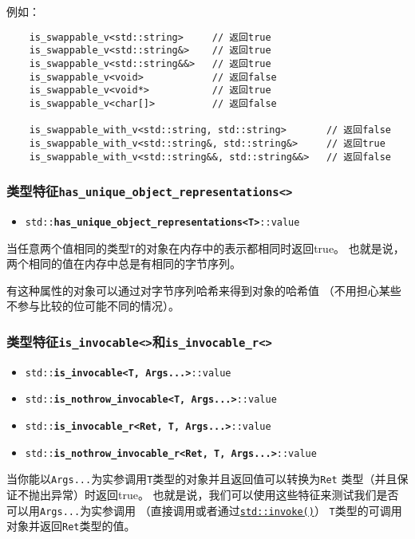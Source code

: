 例如：
\begin{lstlisting}
    is_swappable_v<std::string>     // 返回true
    is_swappable_v<std::string&>    // 返回true
    is_swappable_v<std::string&&>   // 返回true
    is_swappable_v<void>            // 返回false
    is_swappable_v<void*>           // 返回true
    is_swappable_v<char[]>          // 返回false

    is_swappable_with_v<std::string, std::string>       // 返回false
    is_swappable_with_v<std::string&, std::string&>     // 返回true
    is_swappable_with_v<std::string&&, std::string&&>   // 返回false
\end{lstlisting}

\subsubsection{类型特征\texttt{has\_unique\_object\_representations<>}}
\begin{itemize}
    \item[] \texttt{std::\textbf{has\_unique\_object\_representations<T>}::value}
\end{itemize}
当任意两个值相同的类型\texttt{T}的对象在内存中的表示都相同时返回true。
也就是说，两个相同的值在内存中总是有相同的字节序列。

有这种属性的对象可以通过对字节序列哈希来得到对象的哈希值
（不用担心某些不参与比较的位可能不同的情况）。

\subsubsection{类型特征\texttt{is\_invocable<>}和\texttt{is\_invocable\_r<>}}
\begin{itemize}
    \item[] \texttt{std::\textbf{is\_invocable<T, Args...>}::value}
    \item[] \texttt{std::\textbf{is\_nothrow\_invocable<T, Args...>}::value}
    \item[] \texttt{std::\textbf{is\_invocable\_r<Ret, T, Args...>}::value}
    \item[] \texttt{std::\textbf{is\_nothrow\_invocable\_r<Ret, T, Args...>}::value}
\end{itemize}
当你能以\texttt{Args...}为实参调用\texttt{T}类型的对象并且返回值可以转换为\texttt{Ret}
类型（并且保证不抛出异常）时返回true。
也就是说，我们可以使用这些特征来测试我们是否可以用\texttt{Args...}为实参调用
（直接调用或者通过\hyperref[ch33.1]{\texttt{std::invoke()}}）
\texttt{T}类型的可调用对象并返回\texttt{Ret}类型的值。

